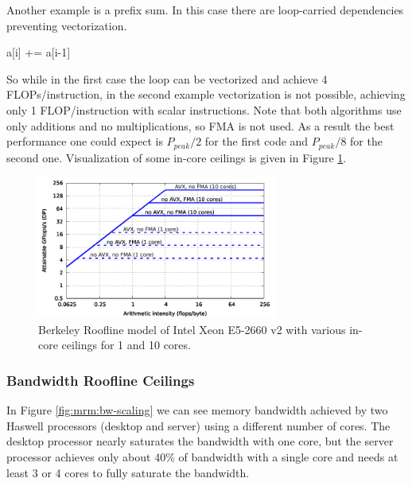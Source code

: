 Another example is a prefix sum.
In this case there are loop-carried dependencies preventing vectorization.
\begin{algorithmic}[1]
      \State a[i] += a[i-1]
  \EndFor
\end{algorithmic}%

So while in the first case the loop can be vectorized and achieve 4 FLOPs/instruction, in the second example vectorization is not possible, achieving only 1 FLOP/instruction with scalar instructions.
Note that both algorithms use only additions and no multiplications, so FMA is not used. As a result the best performance one could expect is $P_{peak}/2$ for the first code and $P_{peak}/8$ for the second one.
Visualization of some in-core ceilings is given in Figure \ref{fig:roofline_emmy_core-ceilings}.

\begin{figure}[t]
   \centering
   \includegraphics[width=0.7\textwidth,clip=true]{images/roofline/roofline_emmy_Xeon2660v2_core-ceilings.pdf}
   \caption{Berkeley Roofline model of Intel Xeon E5-2660 v2 with various in-core ceilings for 1 and 10 cores.}
  \label{fig:roofline_emmy_core-ceilings}
\end{figure}

\subsubsection*{Bandwidth Roofline Ceilings}


In Figure \ref{fig:mrm:bw-scaling} we can see memory bandwidth achieved by two Haswell processors (desktop and server) using a different number of cores. The desktop processor nearly saturates the bandwidth with one core, but the server processor achieves only about 40\% of bandwidth with a single core and needs at least 3 or 4 cores to fully saturate the bandwidth.

